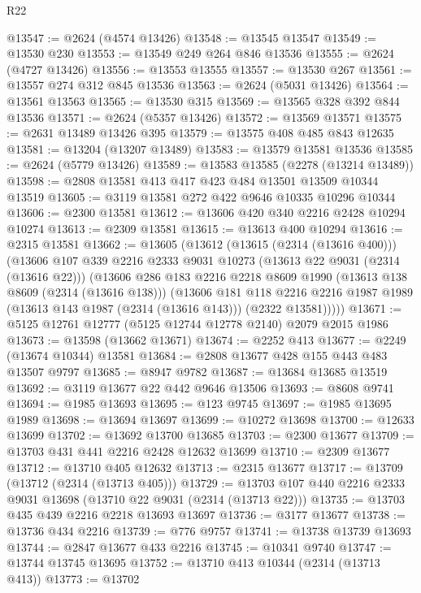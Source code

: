 \begin{lexlean}{R22}
\begin{coremodule}
@13547 := @2624 (@4574 @13426)
@13548 := @13545 @13547
@13549 := @13530 @230
@13553 := @13549 @249 @264 @846 @13536
@13555 := @2624 (@4727 @13426)
@13556 := @13553 @13555
@13557 := @13530 @267
@13561 := @13557 @274 @312 @845 @13536
@13563 := @2624 (@5031 @13426)
@13564 := @13561 @13563
@13565 := @13530 @315
@13569 := @13565 @328 @392 @844 @13536
@13571 := @2624 (@5357 @13426)
@13572 := @13569 @13571
@13575 := @2631 @13489 @13426 @395
@13579 := @13575 @408 @485 @843 @12635
@13581 := @13204 (@13207 @13489)
@13583 := @13579 @13581 @13536
@13585 := @2624 (@5779 @13426)
@13589 := @13583 @13585 (@2278 (@13214 @13489))
@13598 := @2808 @13581 @413 @417 @423 @484 @13501 @13509 @10344 @13519
@13605 := @3119 @13581 @272 @422 @9646 @10335 @10296 @10344
@13606 := @2300 @13581
@13612 := @13606 @420 @340 @2216 @2428 @10294 @10274
@13613 := @2309 @13581
@13615 := @13613 @400 @10294
@13616 := @2315 @13581
@13662 := @13605
    (@13612
      (@13615 (@2314 (@13616 @400)))
      (@13606
        @107
        @339
        @2216
        @2333
        @9031
        @10273
        (@13613 @22 @9031 (@2314 (@13616 @22)))
        (@13606
          @286
          @183
          @2216
          @2218
          @8609
          @1990
          (@13613 @138 @8609 (@2314 (@13616 @138)))
          (@13606
            @181
            @118
            @2216
            @2216
            @1987
            @1989
            (@13613 @143 @1987 (@2314 (@13616 @143)))
            (@2322 @13581)))))
@13671 := @5125 @12761 @12777 (@5125 @12744 @12778 @2140) @2079 @2015 @1986
@13673 := @13598 (@13662 @13671)
@13674 := @2252 @413
@13677 := @2249 (@13674 @10344) @13581
@13684 := @2808 @13677 @428 @155 @443 @483 @13507 @9797
@13685 := @8947 @9782
@13687 := @13684 @13685 @13519
@13692 := @3119 @13677 @22 @442 @9646 @13506
@13693 := @8608 @9741
@13694 := @1985 @13693
@13695 := @123 @9745
@13697 := @1985 @13695 @1989
@13698 := @13694 @13697
@13699 := @10272 @13698
@13700 := @12633 @13699
@13702 := @13692 @13700 @13685
@13703 := @2300 @13677
@13709 := @13703 @431 @441 @2216 @2428 @12632 @13699
@13710 := @2309 @13677
@13712 := @13710 @405 @12632
@13713 := @2315 @13677
@13717 := @13709 (@13712 (@2314 (@13713 @405)))
@13729 := @13703 @107 @440 @2216 @2333 @9031 @13698 (@13710 @22 @9031 (@2314 (@13713 @22)))
@13735 := @13703 @435 @439 @2216 @2218 @13693 @13697
@13736 := @3177 @13677
@13738 := @13736 @434 @2216
@13739 := @776 @9757
@13741 := @13738 @13739 @13693
@13744 := @2847 @13677 @433 @2216
@13745 := @10341 @9740
@13747 := @13744 @13745 @13695
@13752 := @13710 @413 @10344 (@2314 (@13713 @413))
@13773 := @13702

\end{coremodule}
\end{lexlean}
